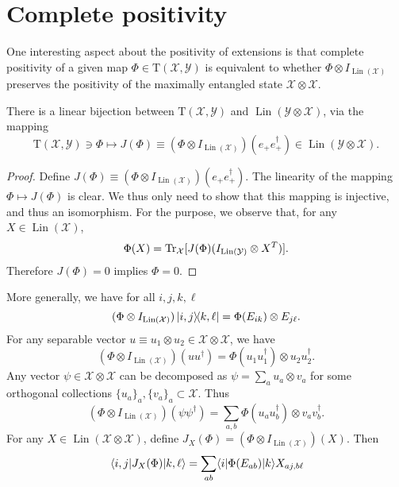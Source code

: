 \documentclass[12pt]{report}
\newcommand{\calY}{{\mathcal{Y}}}
\newcommand{\calX}{{\mathcal{X}}}
\newcommand{\rmT}{{\mathrm{T}}}
\DeclareMathOperator{\Lin}{Lin}
\begin{document}
\section{Complete positivity}

One interesting aspect about the positivity of extensions is that complete positivity of a given map $\Phi\in\rmT(\calX,\calY)$ is equivalent to whether $\Phi\otimes I_{\Lin(\calX)}$ preserves the positivity of the maximally entangled state $\calX\otimes\calX$.

\begin{prop}
	There is a linear bijection between $\rmT(\calX,\calY)$ and $\Lin(\calY\otimes\calX)$, via the mapping
	\begin{equation}
		\rmT(\calX,\calY)\ni \Phi\mapsto
		J(\Phi) \equiv (\Phi\otimes I_{\Lin(\calX)})(e_+ e_+^\dagger)\in\Lin(\calY\otimes\calX).
	\end{equation}
\end{prop}
\begin{proof}
	Define $J(\Phi) \equiv (\Phi\otimes I_{\Lin(\calX)})(e_+ e_+^\dagger)$.
	The linearity of the mapping $\Phi\mapsto J(\Phi)$ is clear.
	We thus only need to show that this mapping is injective, and thus an isomorphism.
	For the purpose, we observe that, for any $X\in\Lin(\calX)$,
	\begin{equation}
		\Phi(X) = \Tr_\calX [J(\Phi)(I_{\Lin(\calY)}\otimes X^T)].
	\end{equation}
	Therefore $J(\Phi)=0$ implies $\Phi=0$.
\end{proof}

More generally, we have for all $i,j,k,\ell$
\begin{equation}
	(\Phi\otimes I_{\Lin(\calX)})\ketbra{i,j}{k,\ell}
	= \Phi(E_{ik}) \otimes E_{j\ell}.
\end{equation}
For any separable vector $u\equiv u_1\otimes u_2\in\calX\otimes\calX$, we have
\begin{equation}
	(\Phi\otimes I_{\Lin(\calX)}) (uu^\dagger)
	= \Phi(u_1 u_1^\dagger) \otimes u_2 u_2^\dagger.
\end{equation}
Any vector $\psi\in\calX\otimes\calX$ can be decomposed as
$\psi=\sum_a u_a\otimes v_a$ for some orthogonal collections $\{u_a\}_a,\{v_a\}_a\subset\calX$.
Thus
\begin{equation}
	(\Phi\otimes I_{\Lin(\calX)})(\psi\psi^\dagger)
	= \sum_{a,b} \Phi(u_a u_b^\dagger)\otimes v_a v_b^\dagger.
\end{equation}
For any $X\in\Lin(\calX\otimes\calX)$, define
	$J_X(\Phi)
		= (\Phi\otimes I_{\Lin(\calX)})(X)$.
Then
\begin{equation}
	\mel{i,j}{J_X(\Phi)}{k,\ell}
	= \sum_{ab} \langle i|\Phi(E_{ab})|k\rangle X_{aj,b\ell}
\end{equation}
\end{document}
